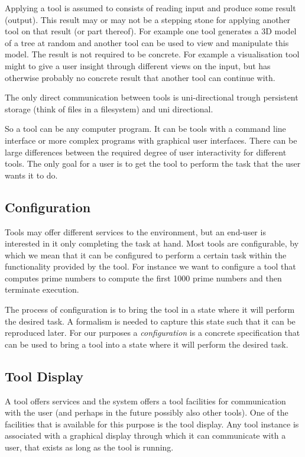 \documentclass{article}
\begin{document}
   Applying a tool is assumed to consists of reading input and produce some
   result (output).  This result may or may not be a stepping stone for
   applying another tool on that result (or part thereof).  For example one
   tool generates a 3D model of a tree at random and another tool can be used
   to view and manipulate this model. The result is not required to be
   concrete. For example a visualisation tool might to give a user insight
   through different views on the input, but has otherwise probably no concrete
   result that another tool can continue with.

   The only direct communication between tools is uni-directional trough
   persistent storage (think of files in a filesystem) and uni directional.

   So a tool can be any computer program. It can be tools with a command line
   interface or more complex programs with graphical user interfaces.  There
   can be large differences between the required degree of user interactivity
   for different tools. The only goal for a user is to get the tool to perform
   the task that the user wants it to do.

  \subsection{Configuration}

   Tools may offer different services to the environment, but an end-user is
   interested in it only completing the task at hand. Most tools are
   configurable, by which we mean that it can be configured to perform a
   certain task within the functionality provided by the tool. For instance we
   want to configure a tool that computes prime numbers to compute the first
   1000 prime numbers and then terminate execution.

   The process of configuration is to bring the tool in a state where it will
   perform the desired task. A formalism is needed to capture this state such
   that it can be reproduced later. For our purposes a \textit{configuration}
   is a concrete specification that can be used to bring a tool into a state
   where it will perform the desired task.

  \subsection{Tool Display}

   A tool offers services and the system offers a tool facilities for
   communication with the user (and perhaps in the future possibly also other
   tools). One of the facilities that is available for this purpose is the tool
   display. Any tool instance is associated with a graphical display through
   which it can communicate with a user, that exists as long as the tool is
   running.
   
\end{document}
